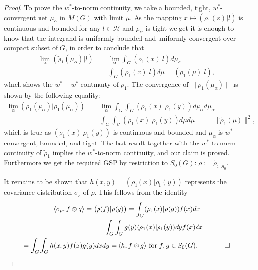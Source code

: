 \documentclass[10pt,a4paper]{amsart}
\begin{document}
\begin{proof}
To prove the ${w}^*$-to-norm continuity, we take a bounded, tight,
$w^\ast$-convergent net $\mu_{\alpha}$ in $M(G)$ with limit $\mu$. As
the mapping $x \mapsto ({\rho_1}(x)|l)$ is continuous and bounded for
any $l \in \mathcal{H}$ and $\mu_{\alpha}$ is tight we get it is enough
to know that the integrand is uniformly bounded and uniformly convergent
over compact subset of $G$, in order to conclude that
%
\begin{align*}
\lim_{\alpha}(\tilde{\rho}_1(\mu_{\alpha})|l) & = \lim_{\alpha} \int_G({\rho}_1(x)|l) d\mu_{\alpha}\\
& = \int_G({\rho}_1(x)|l) d\mu
 = (\tilde{\rho}_1(\mu)|l),
\end{align*}
%
which shows the ${w}^*-{w}^*$ continuity of $\tilde{\rho}_1$.
The convergence of
$\|\tilde{\rho}_1(\mu_{\alpha}) \|$
is shown by the following equality:
%
\begin{align*}
\lim_{\alpha} (\tilde{\rho}_1(\mu_{\alpha}) | \tilde{\rho}_1(\mu_{\alpha})) & = \lim_{\alpha }\int_G \int_G
(\rho_1(x)|\rho_1(y)) d\mu_{\alpha} d\mu_{\alpha}\\
& = \int_G \int_G (\rho_1(x)|\rho_1(y)) d\mu d\mu \quad
  = \, \,  \|\tilde{\rho}_1(\mu)\|^2,
\end{align*}
which is true as $(\rho_1(x)|\rho_1(y))$ is continuous and
bounded and $\mu_{\alpha}$ is $w^\ast$-convergent,
bounded, and tight. The last result together with the
${w}^*$-to-norm continuity of $\tilde{\rho}_1$
implies the ${w}^*$-to-norm continuity, and our claim is proved.
Furthermore %
we get the required GSP by restriction to $ {S_{0}(G)}$:
$\rho  := \tilde{\rho}_{1}| _{S_{0}}$.


It remains to be shown that
$h(x,y) = (\rho _{1}(x)| \rho_{1}(y))$
represents  the covariance distribution
$\sigma _{\rho}$ of $\rho $. This follows from the identity
\begin{gather*}
\langle \sigma _{\rho},f\otimes g \rangle = \bigl( \rho (f)| \rho
(\bar{g})\bigr)  = \int^{}_{G} (\rho _{1}(x)| \rho (\bar{g})) f(x) dx \\ \quad\quad\quad\quad\quad\quad\quad=
\int^{}_{G} \int^{}_{G} g(y)(\rho _{1}(x)| \rho _{1}(y)) dy f(x) dx\\
=
\int^{}_{G} \int^{}_{G}h(x,y) f(x) g(y) dx dy
= \langle h,f\otimes g\rangle \text{ for }f,g \in {S_{0}(G)}.
\quad \quad \qed 
\end{gather*}
\end{proof}
\end{document}
